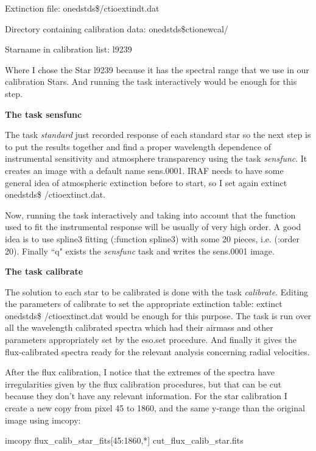 Extinction file:                              onedstds\$/ctioextindt.dat

Directory containing calibration data:   onedstds\$ctionewcal/

Starname in calibration list:                l9239

Where I chose the Star l9239 because it has the spectral range that we use in our calibration Stars. And running the task interactively would be enough for this step.

\textbf{The task sensfunc}

The task \textit{standard} just recorded response of each standard star so the next step is to put the results together and find a proper wavelength dependence of instrumental sensitivity and atmosphere transparency using the task \textit{sensfunc}. It creates an image with a default name sens.0001. IRAF needs to have some general idea of atmospheric extinction before to start, so I set again extinct onedstds\$ /ctioextinct.dat.

Now, running the task interactively and taking into account that the function used to fit the instrumental response will be usually of very high order. A good idea is to use spline3 fitting (:function spline3) with some 20 pieces, i.e. (:order 20).
Finally ``q" exists the \textit{sensfunc} task and writes the sens.0001 image.

\textbf{The task calibrate}

The solution to each star to be calibrated is done with the task \textit{calibrate}. Editing the parameters of calibrate to set the appropriate extinction table: extinct onedstds\$ /ctioextinct.dat would be enough for this purpose. The task is run over all the wavelength calibrated spectra which had their airmass and other parameters appropriately set by the eso.set procedure. And finally it gives the flux-calibrated spectra ready for the relevant analysis concerning radial velocities.

After the flux calibration, I notice that the extremes of the spectra have irregularities given by the flux calibration procedures, but that can be cut because they don't have any relevant information. For the star calibration I create a new copy from pixel 45 to 1860, and the same y-range than the original image using imcopy:

\begin{center}
imcopy flux\_calib\_star\_fits[45:1860,*] cut\_flux\_calib\_star.fits
\end{center}

